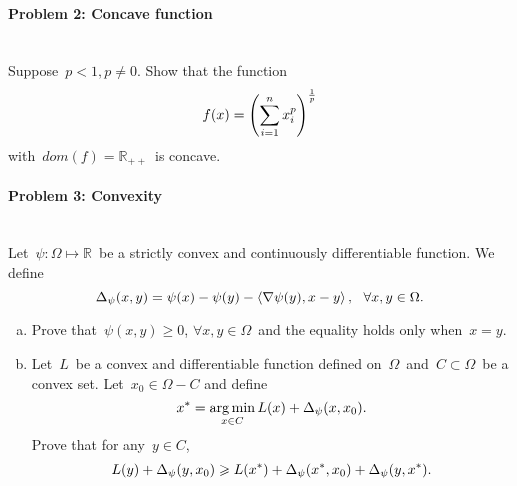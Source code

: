 \documentclass[a4paper]{article}
\newenvironment{solution}
{\color{blue} \paragraph{Solution.}}
{\newline \qed}
\begin{document}
\paragraph{Problem 2: Concave function}
~\\

\noindent
Suppose~$p < 1, p \neq 0$. Show that the function
\begin{equation}
f(x) = \left( \sum^n_{i=1} x^p_i \right)^{\frac{1}{p}} \notag
\end{equation}
with~$dom(f) = \mathbb{R}_{++}$~is concave.




\paragraph{Problem 3: Convexity}
~\\

\noindent
Let~$\psi : \Omega \mapsto \mathbb{R}$~be a strictly convex and continuously differentiable function. We define
\begin{equation}
\Delta_{\psi} (x, y) = \psi(x) - \psi(y) - \Braket{\nabla \psi(y), x - y}, ~~\forall x, y \in \Omega. \notag
\end{equation}

\begin{enumerate}[a)]
    \item Prove that~$\psi(x, y) \geqslant 0$, $\forall x, y \in \Omega$~and the equality holds only when~$x = y$.
    
    \item Let~$L$~be a convex and differentiable function defined on~$\Omega$~and~$C \subset \Omega$~be a convex set. 
    Let~$x_0 \in \Omega - C$ and define
    \begin{equation}
        x^* = \mathop{\arg\min}\limits_{x \in C} L(x) + \Delta_{\psi} (x, x_0). \notag
    \end{equation}
    Prove that for any~$y \in C$,
    \begin{equation}
        L(y) + \Delta_{\psi}(y, x_0) \geqslant L(x^*) + \Delta_{\psi} (x^*, x_0) + \Delta_{\psi} (y, x^*). \notag
    \end{equation}
\end{enumerate}

\end{document}
